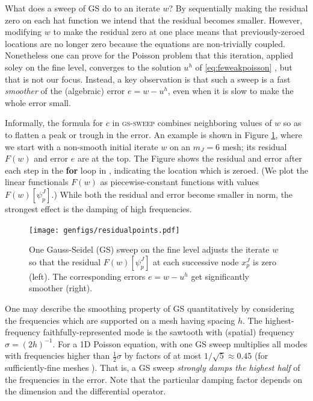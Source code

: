 \documentclass[letterpaper,final,12pt,reqno]{amsart}
\theoremstyle{claim}
\numberwithin{equation}{section}
\numberwithin{figure}{section}
\numberwithin{table}{section}
\numberwithin{theorem}{section}
\begin{document}
What does a sweep of GS do to an iterate $w$?  By sequentially making the residual zero on each hat function we intend that the residual becomes smaller.  However, modifying $w$ to make the residual zero at one place means that previously-zeroed locations are no longer zero because the equations are non-trivially coupled.  Nonetheless one can prove for the Poisson problem that this iteration, applied soley on the fine level, converges to the solution $u^h$ of \eqref{eq:feweakpoisson} \cite[for example]{Greenbaum1997}, but that is not our focus.  Instead, a key observation is that such a sweep is a fast \emph{smoother} of the (algebraic) error $e=w-u^h$, even when it is slow to make the whole error small.

Informally, the formula for $c$ in \textsc{gs-sweep} combines neighboring values of $w$ so as to flatten a peak or trough in the error.  An example is shown in Figure \ref{fig:residualpoints}, where we start with a non-smooth initial iterate $w$ on an $m_J=6$ mesh; its residual $F(w)$ and error $e$ are at the top.  The Figure shows the residual and error after each step in the \textbf{for} loop in , indicating the location which is zeroed.  (We plot the linear functionals $F(w)$ as piecewise-constant functions with values $F(w)[\psi_p^J]$.)  While both the residual and error become smaller in norm, the strongest effect is the damping of high frequencies.

\begin{figure}[t]
\texttt{[image: genfigs/residualpoints.pdf]}
\caption{One Gauss-Seidel (GS) sweep on the fine level adjusts the iterate $w$ so that the residual $F(w)[\psi_p^J]$ at each successive node $x_p^J$ is zero (left).  The corresponding errors $e=w-u^h$ get significantly smoother (right).}
\label{fig:residualpoints}
\end{figure}

One may describe the smoothing property of GS quantitatively by considering the frequencies which are supported on a mesh having spacing $h$.  The highest-frequency faithfully-represented mode is the sawtooth with (spatial) frequency $\sigma=(2h)^{-1}$.  For a 1D Poisson equation, with one GS sweep multiplies all modes with frequencies higher than $\frac{1}{2} \sigma$ by factors of at most $1/\sqrt{5}\approx 0.45$ (for sufficiently-fine meshes \cite[Chapter 4]{Briggsetal2000}).  That is, a GS sweep \emph{strongly damps the highest half} of the frequencies in the error.  Note that the particular damping factor depends on the dimension and the differential operator.
\end{document}
